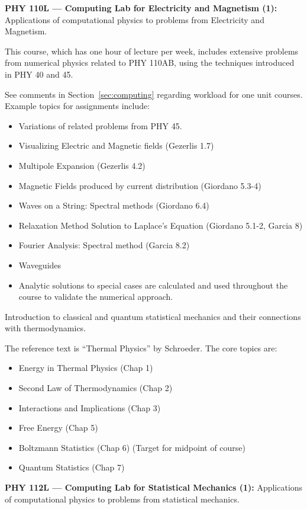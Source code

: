 \documentclass[12pt]{article}
\begin{document}
\vskip 1cm
\noindent
{\bf PHY 110L --- Computing Lab for Electricity and Magnetism (1):}
Applications of computational physics to problems from Electricity and
Magnetism.

This course, which has one hour of lecture per week, includes
extensive problems from numerical physics related to PHY 110AB, using
the techniques introduced in PHY 40 and 45.

See comments in Section~\ref{sec:computing} regarding workload for one
unit courses.  Example topics for assignments include:
\begin{itemize}
\item Variations of related problems from PHY 45.
\item Visualizing Electric and Magnetic fields (Gezerlis 1.7)
\item Multipole Expansion (Gezerlis 4.2)
\item Magnetic Fields produced by current distribution (Giordano 5.3-4)
\item Waves on a String: Spectral methods (Giordano 6.4)
\item Relaxation Method Solution to Laplace's Equation (Giordano 5.1-2, Garcia 8)
\item Fourier Analysis:  Spectral method (Garcia 8.2)
\item Waveguides
\item Analytic solutions to special cases are calculated and used throughout the
  course to validate the numerical approach.
\end{itemize}

\vskip 1cm
Introduction to classical and quantum statistical mechanics and their connections with thermodynamics.

The reference text is ``Thermal Physics'' by Schroeder.  The core topics are:
\begin{itemize}
\item Energy in Thermal Physics (Chap 1)
\item Second Law of Thermodynamics (Chap 2)
\item Interactions and Implications (Chap 3)
\item Free Energy (Chap 5)
\item Boltzmann Statistics (Chap 6) (Target for midpoint of course)
\item Quantum Statistics (Chap 7) 
\end{itemize}

\vskip 1cm
\noindent
{\bf PHY 112L --- Computing Lab for Statistical Mechanics (1):}
Applications of computational physics to problems from statistical mechanics.
\end{document}
